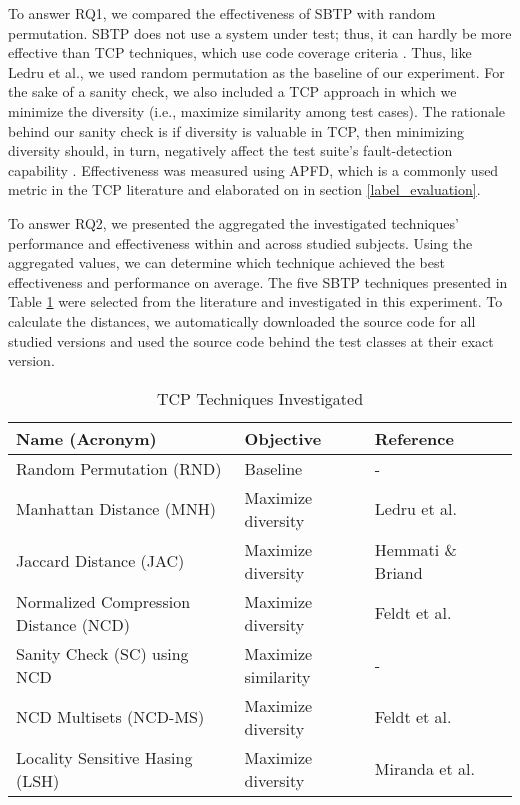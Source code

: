 \documentclass[runningheads]{llncs}
\begin{document}
To answer RQ1, we compared the effectiveness of SBTP with random permutation. SBTP does not use a system under test; thus, it can hardly be more effective than TCP techniques, which use code coverage criteria \cite{ledru2012prioritizing}. Thus, like Ledru et al., we used random permutation as the baseline of our experiment. For the sake of a sanity check, we also included a TCP approach in which we minimize the diversity (i.e., maximize similarity among test cases). The rationale behind our sanity check is if diversity is valuable in TCP, then minimizing diversity should, in turn, negatively affect the test suite's fault-detection capability \cite{henard2016comparing}. Effectiveness was measured using APFD, which is a commonly used metric in the TCP literature and elaborated on in section \ref{label_evaluation}. 

To answer RQ2, we presented the aggregated the investigated techniques' performance and effectiveness within and across studied subjects. Using the aggregated values, we can determine which technique achieved the best effectiveness and performance on average. The five SBTP techniques presented in Table \ref{table:investigated_techniques} were selected from the literature and investigated in this experiment. To calculate the distances, we automatically downloaded the source code for all studied versions and used the source code behind the test classes at their exact version.
 
\begin{table}[h]
\centering
\caption {TCP Techniques Investigated}
\label{table:investigated_techniques}
\begin{tabular}{|l|l|l|l|}
\hline                       
 Name (Acronym) & Objective & Reference \\
\hline
\hline 
Random Permutation (RND) & Baseline & - \\ 
Manhattan Distance (MNH) & Maximize diversity & Ledru et al. \cite{ledru2012prioritizing} \\ 
Jaccard Distance (JAC) & Maximize diversity & Hemmati \& Briand \cite{hemmati2010industrial} \\ 
Normalized Compression Distance (NCD) & Maximize diversity & Feldt et al. \cite{feldt2008searching} \\ 
Sanity Check (SC) using NCD & Maximize similarity & - \\ 
NCD Multisets (NCD-MS) & Maximize diversity & Feldt et al. \cite{feldt2016test} \\ 
Locality Sensitive Hasing (LSH) & Maximize diversity & Miranda et al.\cite{miranda2018fast} \\ 
\hline
\end{tabular}
\end{table} 
 
\end{document}
